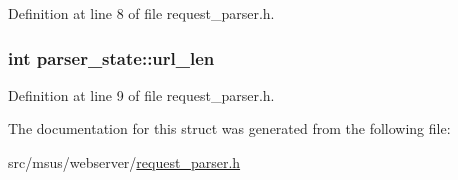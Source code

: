 Definition at line 8 of file request\-\_\-parser.\-h.

\hypertarget{structparser__state_a3ece333d4625d8c6a5f696a738b2fc41}{
\subsubsection[{url\-\_\-len}]{\setlength{\rightskip}{0pt plus 5cm}int parser\-\_\-state\-::url\-\_\-len}}\label{structparser__state_a3ece333d4625d8c6a5f696a738b2fc41}


Definition at line 9 of file request\-\_\-parser.\-h.



The documentation for this struct was generated from the following file\-:\begin{DoxyCompactItemize}
\item 
src/msus/webserver/\hyperlink{request__parser_8h}{request\-\_\-parser.\-h}\end{DoxyCompactItemize}
